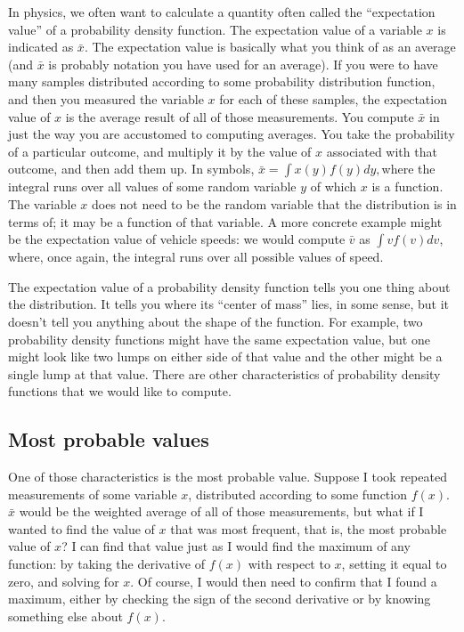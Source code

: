 \documentclass[12pt]{book}
\begin{document}
\noindent In physics, we often want to calculate a quantity often called the “expectation value” of a probability density function. The expectation value of a variable $x$ is indicated as $\bar{x}$. The expectation value is basically what you think of as an average (and $\bar{x}$ is probably notation you have used for an average). If you were to have many samples distributed according to some probability distribution function, and then you measured the variable $x$ for each of these samples, the expectation value of $x$ is the average result of all of those measurements. You compute $\bar{x}$ in just the way you are accustomed to computing averages. You take the probability of a particular outcome, and multiply it by the value of $x$ associated with that outcome, and then add them up. In symbols, $\bar{x}= \int x(y) f (y)dy, $where the integral runs over all values of some random variable $y$ of which $x$ is a function. The variable $x$ does not need to be the random variable that the distribution is in 
terms of; it may be a function of that variable. A more concrete example might be the expectation value of vehicle speeds: we would compute $\bar{v}$ as $\int v f (v)dv$, where, once again, the integral runs over all possible values of speed.

The expectation value of a probability density function tells you one thing about the distribution. It tells you where its “center of mass” lies, in some sense, but it doesn’t tell you anything about the shape of the function. For example, two probability density functions might have the same expectation value, but one might look like two lumps on either side of that value and the other might be a single lump at that value. There are other characteristics of probability density functions that we would like to compute.

\subsection{Most probable values}

\noindent One of those characteristics is the most probable value. Suppose I took repeated measurements of some variable $x$, distributed according to some function $f (x)$. $\bar{x}$ would be the weighted average of all of those measurements, but what if I wanted to find the value of $x$ that was most frequent, that is, the most probable value of $x$? I can find that value just as I would find the maximum of any function: by taking the derivative of $f (x)$ with respect to $x$, setting it equal to zero, and solving for $x$. Of course, I would then need to confirm that I found a maximum, either by checking the sign of the second derivative or by knowing something else about $f (x)$.
\end{document}
